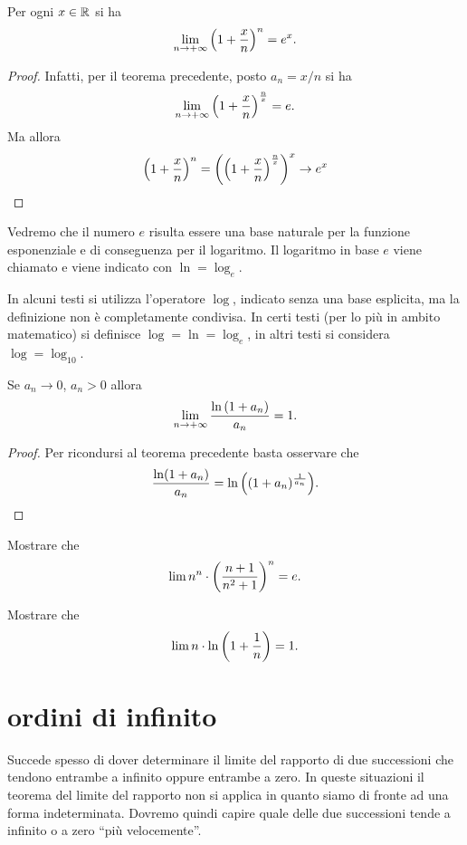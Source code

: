 \begin{corollary}
Per ogni $x\in \mathbb R$ si ha
\[
  \lim_{n\to +\infty} {\left( 1+ \frac x n \right)}^n = e^x.
\]
\end{corollary}
%
\begin{proof}
Infatti, per il teorema precedente, posto $a_n = x/n$ si ha
\[
\lim_{n\to +\infty}{\left( 1+\frac x n \right)}^{\frac n x} = e.
\]
Ma allora
\[
{\left( 1+ \frac x n \right)}^n = {\left( {\left( 1+\frac x n \right)}^{\frac n x} \right)}^x
\to e^x
\]
\end{proof}

\begin{definition}
Vedremo che il numero $e$ risulta essere una base naturale per la funzione
esponenziale e di conseguenza per il logaritmo. Il logaritmo in base
$e$ viene chiamato  e viene indicato con $\ln = \log_e$.
\end{definition}

In alcuni testi si utilizza l'operatore $\log$, indicato senza una base esplicita,
ma la definizione non è completamente condivisa.
In certi testi (per lo più in ambito matematico)
si definisce $\log  = \ln = \log_e$,
in altri testi si considera $\log = \log_{10}$.

\begin{corollary}
Se $a_n \to 0$, $a_n>0$ allora
\[
 \lim_{n\to +\infty} \frac{\ln {\left( 1+ a_n \right)}}{a_n} = 1.
\]
\end{corollary}
%
\begin{proof}
Per ricondursi al teorema precedente basta osservare che
\[
  \frac{\ln(1+a_n)}{a_n}
  = \ln {\left( (1+a_n)^{\frac 1 {a_n}} \right)}.
\]
\end{proof}

\begin{exercise}
Mostrare che
\[
  \lim n^n\cdot {\left( \frac{n+1}{n^2+1} \right)}^n = e.
\]
\end{exercise}

\begin{exercise}
Mostrare che
\[
\lim n\cdot \ln{\left( 1 + \frac 1 n \right)} = 1.
\]
\end{exercise}

\section{ordini di infinito}

Succede spesso di dover determinare il limite
del rapporto di due successioni che tendono entrambe a infinito
oppure entrambe a zero.
In queste situazioni il teorema del limite del rapporto non
si applica in quanto siamo di fronte ad una forma indeterminata.
Dovremo quindi capire quale delle due successioni
tende a infinito o a zero ``più velocemente''.


